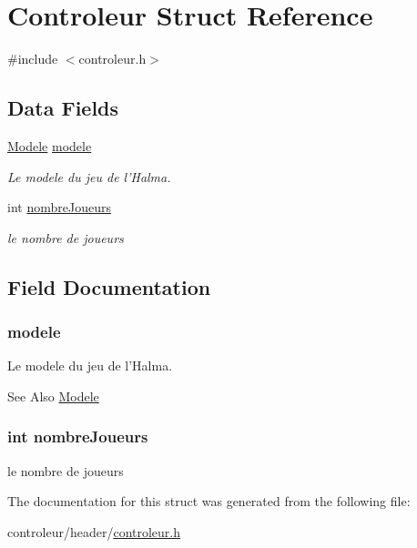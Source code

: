 \hypertarget{struct_controleur}{\section{Controleur Struct Reference}
\label{struct_controleur}
}


{\ttfamily \#include $<$controleur.\-h$>$}

\subsection*{Data Fields}
\begin{DoxyCompactItemize}
\item 
\hyperlink{struct_modele}{Modele} \hyperlink{struct_controleur_a002373438b6d29867c9f59001e8f4155}{modele}
\begin{DoxyCompactList}\small\item\em Le modele du jeu de l'Halma. \end{DoxyCompactList}\item 
int \hyperlink{struct_controleur_a8ec31041fec4c54afd404998e104d0f9}{nombre\-Joueurs}
\begin{DoxyCompactList}\small\item\em le nombre de joueurs \end{DoxyCompactList}\end{DoxyCompactItemize}


\subsection{Field Documentation}
\hypertarget{struct_controleur_a002373438b6d29867c9f59001e8f4155}{
\subsubsection[{modele}]{ modele}}\label{struct_controleur_a002373438b6d29867c9f59001e8f4155}


Le modele du jeu de l'Halma. 

\begin{DoxySeeAlso}{See Also}
\hyperlink{struct_modele}{Modele} 
\end{DoxySeeAlso}
\hypertarget{struct_controleur_a8ec31041fec4c54afd404998e104d0f9}{
\subsubsection[{nombre\-Joueurs}]{\setlength{\rightskip}{0pt plus 5cm}int nombre\-Joueurs}}\label{struct_controleur_a8ec31041fec4c54afd404998e104d0f9}


le nombre de joueurs 



The documentation for this struct was generated from the following file\-:\begin{DoxyCompactItemize}
\item 
controleur/header/\hyperlink{controleur_8h}{controleur.\-h}\end{DoxyCompactItemize}
